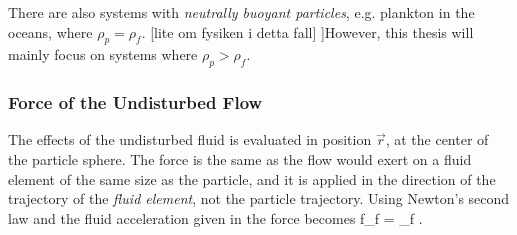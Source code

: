 There are also systems with \emph{neutrally buoyant particles}, e.g. plankton in the oceans, where $\rho_p = \rho_f$. [lite om fysiken i detta fall] ]However, this thesis will mainly focus on systems where $\rho_p > \rho_f$.




\subsubsection{Force of the Undisturbed Flow}

The effects of the undisturbed fluid is evaluated in position $\vec r$, at the center of the particle sphere. The force is the same as the flow would exert on a fluid element of the same size as the particle, and it is applied in the direction of the trajectory of the \emph{fluid element}, not the particle trajectory. Using Newton's second law and the fluid acceleration given in  the force becomes
\beq
\vec f_f = \rho_f .
\eeq


